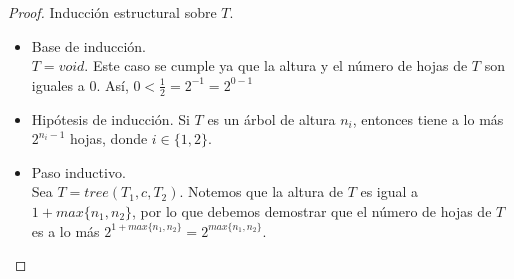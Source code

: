\documentclass[letterpaper,11pt]{article}
\begin{document}
\begin{enumerate}
\begin{itemize}
        \begin{proof}
            Inducción estructural sobre $T$.

            \begin{itemize}
                \item Base de inducción. \\ 
                $T = void$. Este caso se cumple ya que la altura y el número de 
                hojas de $T$ son iguales a $0$. Así, $0 < \frac{1}{2} = 2^{-1} = 
                2^{0-1}$

                \item Hipótesis de inducción. Si $T$ es un árbol de altura 
                $n_{i}$, entonces tiene a lo más $2^{n_{i}-1}$ hojas, donde 
                $i \in \{1,2\}$.

                \item Paso inductivo. \\ 
                Sea $T = tree(T_{1}, c, T_{2})$. Notemos que la altura de $T$ es 
                igual a $1 + max \{n_{1}, n_{2}\}$, por lo que debemos demostrar 
                que el número de hojas de $T$ es a lo más 
                $2^{1 + max\{n_{1}, n_{2}\}} = 2^{max\{n_{1}, n_{2}\}}$.


\end{itemize}
\end{proof}
\end{itemize}
\end{enumerate}
\end{document}
